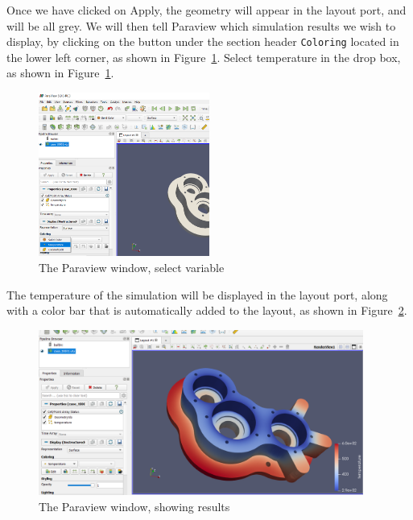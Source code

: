 Once we have clicked on Apply, the geometry will appear in the layout port, and will be all grey.  We will then tell Paraview which simulation results we wish to display, by clicking on the  button under the section header \texttt{Coloring} located in the lower left corner, as shown in Figure~\ref{fg:paraview-2}.  Select temperature in the drop box, as shown in Figure~\ref{fg:paraview-2}.

\begin{figure}[H]
\begin{center}
\includegraphics[width=0.5\textwidth]{paraview-2}
\caption{The Paraview window, select variable}\label{fg:paraview-2}
\end{center}
\end{figure}

The temperature of the simulation will be displayed in the layout port, along with a color bar that is automatically added to the layout, as shown in Figure~\ref{fg:paraview-3}.

\begin{figure}[H]
\begin{center}
\includegraphics[width=0.95\textwidth]{paraview-3}
\caption{The Paraview window, showing results}\label{fg:paraview-3}
\end{center}
\end{figure}

